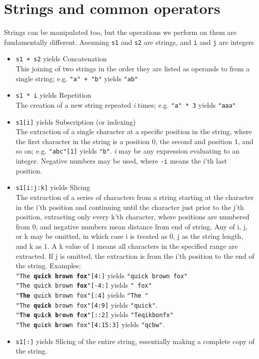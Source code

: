 \section{Strings and common operators}

Strings can be manipulated too, but the operations we perform on   them are fundamentally different. Assuming \texttt{s1} and \texttt{s2} are strings,   and \texttt{i} and \texttt{j} are integers
\begin{itemize}
	\item 
\texttt{s1 + s2} yields Concatenation
\\    This joining of two strings in the order they are listed as operands    to from a single string; e.g. 
\texttt{"a" + "b"} yields \texttt{"ab"}
	\item 
\texttt{s1 * i} yields Repetition
\\    The creation of a new string repeated \textit{i} times; e.g. 
\texttt{"a" * 3} yields \texttt{"aaa"}
	\item 
\texttt{s1[i]} yields Subscription (or indexing)
\\    The extraction of a single character at a specific position in the    string, where the first character in the string is a position 0,    the second and position 1, and so on; e.g. 
\texttt{"abc"[1]}    yields \texttt{"b"}. \textit{i} may be any expression evaluating to an integer.    Negative numbers may be used, where 
\texttt{-i} means the i'th    last position.
	\item 
\texttt{s1[i:j:k]} yields Slicing
\\    The extraction of a series of characters from a string starting at    the character in the i'th position and continuing until the    character just prior to the j'th position, extracting only every    k'th character, where positions are numbered from 0, and negative    numbers mean distance from end of string. Any of i, j, or k may be    omitted, in which case i is treated as 0, j as the string length, and    k as 1.  A k value of 1 means all characters in the    specified range are extracted. If j is omitted, the extraction is    from the i'th position to the end of the string.  Examples:
\\
\texttt{"The \textbf{quick brown fox}"[4:]} yields \texttt{"quick brown fox"}
\\
\texttt{"The quick brown\textbf{ fox}"[-4:]} yields \texttt{" fox"}
\\
\texttt{"\textbf{The }quick brown fox"[:4]} yields \texttt{"The "}
\\
\texttt{"The \textbf{quick} brown fox"[4:9]} yields \texttt{"quick"}.
\\
\texttt{"\textbf{T}h\textbf{e} \textbf{q}u\textbf{i}c\textbf{k} \textbf{b}r\textbf{o}w\textbf{n} \textbf{f}o\textbf{x}"[::2]} yields \texttt{"Teqikbonfx"}
\\
\texttt{"The \textbf{q}ui\textbf{c}k \textbf{b}ro\textbf{w}n fox"[4:15:3]} yields \texttt{"qcbw"}.
\\
	\item 
\texttt{s1[:]} yields Slicing of the entire string,    essentially making a complete copy of the string.
\end{itemize}

